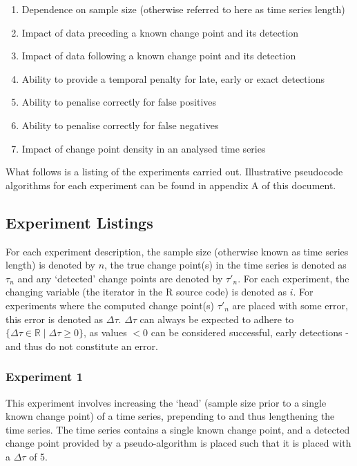 \documentclass[../main.tex]{subfiles}
\begin{document}
\begin{enumerate}
    \item Dependence on sample size (otherwise referred to here as time series length)
    \item Impact of data preceding a known change point and its detection
    \item Impact of data following a known change point and its detection
    \item Ability to provide a temporal penalty for late, early or exact detections
    \item Ability to penalise correctly for false positives
    \item Ability to penalise correctly for false negatives
    \item Impact of change point density in an analysed time series
\end{enumerate}

What follows is a listing of the experiments carried out. Illustrative pseudocode algorithms for each experiment can be found in appendix A of this document.

\subsection{Experiment Listings}

For each experiment description, the sample size (otherwise known as time series length) is denoted by $n$, the true change point(s) in the time series is denoted as $\tau_n$ and any `detected' change points are denoted by $\tau'_{n}$. For each experiment, the changing variable (the iterator in the \textsf{R} source code) is denoted as $i$. For experiments where the computed change point(s) $\tau'_n$ are placed with some error, this error is denoted as $\Delta \tau$. $\Delta \tau$ can always be expected to adhere to $\{ \Delta \tau \in \mathbb{R} \mid \Delta \tau \geq 0 \}$, as values $< 0$ can be considered successful, early detections - and thus do not constitute an error.

\subsubsection{Experiment 1}

This experiment involves increasing the `head' (sample size prior to a single known change point) of a time series, prepending to and thus lengthening the time series. The time series contains a single known change point, and a detected change point provided by a pseudo-algorithm is placed such that it is placed with a $\Delta \tau$ of 5.
\end{document}

